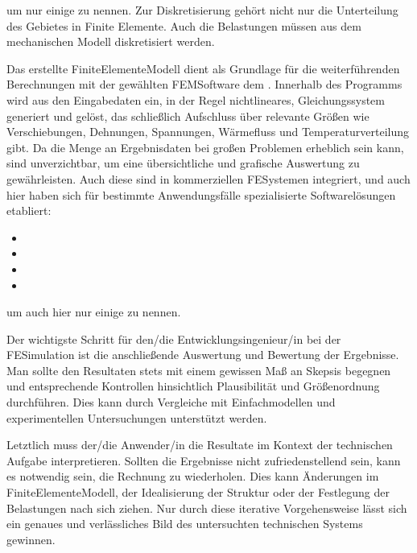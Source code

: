 \documentclass[letterpaper,10pt,german]{jupyterBook}
\begin{document}
\sphinxAtStartPar
um nur einige zu nennen.
Zur Diskretisierung gehört nicht nur die Unterteilung des Gebietes in Finite Elemente. Auch die Belastungen müssen aus dem mechanischen Modell diskretisiert werden.

\sphinxAtStartPar
Das erstellte Finite\sphinxhyphen{}Elemente\sphinxhyphen{}Modell dient als Grundlage für die weiterführenden Berechnungen mit der gewählten FEM\sphinxhyphen{}Software \sphinxhyphen{} dem . Innerhalb des Programms wird aus den Eingabedaten ein, in der Regel nichtlineares, Gleichungssystem generiert und gelöst, das schließlich Aufschluss über relevante Größen wie Verschiebungen, Dehnungen, Spannungen, Wärmefluss und Temperaturverteilung gibt. Da die Menge an Ergebnisdaten bei großen Problemen erheblich sein kann, sind  unverzichtbar, um eine übersichtliche und grafische Auswertung zu gewährleisten. Auch diese sind in kommerziellen FE\sphinxhyphen{}Systemen integriert, und auch hier haben sich für bestimmte Anwendungsfälle spezialisierte Softwarelösungen etabliert:
\begin{itemize}
\item {} 
\sphinxAtStartPar
{}

\item {} 
\sphinxAtStartPar
{}

\item {} 
\sphinxAtStartPar
{}

\item {} 
\sphinxAtStartPar
{}

\end{itemize}

\sphinxAtStartPar
um auch hier nur einige zu nennen.

\sphinxAtStartPar
Der wichtigste Schritt für den/die Entwicklungsingenieur/in bei der FE\sphinxhyphen{}Simulation ist die anschließende Auswertung und Bewertung der Ergebnisse. Man sollte den Resultaten stets mit einem gewissen Maß an Skepsis begegnen und entsprechende Kontrollen hinsichtlich Plausibilität und Größenordnung durchführen. Dies kann durch Vergleiche mit Einfachmodellen und experimentellen Untersuchungen unterstützt werden.

\sphinxAtStartPar
Letztlich muss der/die Anwender/in die Resultate im Kontext der technischen Aufgabe interpretieren. Sollten die Ergebnisse nicht zufriedenstellend sein, kann es notwendig sein, die Rechnung zu wiederholen. Dies kann Änderungen im Finite\sphinxhyphen{}Elemente\sphinxhyphen{}Modell, der Idealisierung der Struktur oder der Festlegung der Belastungen nach sich ziehen. Nur durch diese iterative Vorgehensweise lässt sich ein genaues und verlässliches Bild des untersuchten technischen Systems gewinnen.
\end{document}
